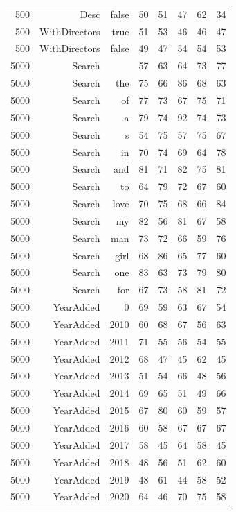 \begin{longtable}{rrrrrrrr}
	500 & Desc & false & 50 & 51 & 47 & 62 & 34 \\
	500 & WithDirectors & true & 51 & 53 & 46 & 46 & 47 \\
	500 & WithDirectors & false & 49 & 47 & 54 & 54 & 53 \\
	5000 & Search &  & 57 & 63 & 64 & 73 & 77 \\
	5000 & Search & the & 75 & 66 & 86 & 68 & 63 \\
	5000 & Search & of & 77 & 73 & 67 & 75 & 71 \\
	5000 & Search & a & 79 & 74 & 92 & 74 & 73 \\
	5000 & Search & s & 54 & 75 & 57 & 75 & 67 \\
	5000 & Search & in & 70 & 74 & 69 & 64 & 78 \\
	5000 & Search & and & 81 & 71 & 82 & 75 & 81 \\
	5000 & Search & to & 64 & 79 & 72 & 67 & 60 \\
	5000 & Search & love & 70 & 75 & 68 & 66 & 84 \\
	5000 & Search & my & 82 & 56 & 81 & 67 & 58 \\
	5000 & Search & man & 73 & 72 & 66 & 59 & 76 \\
	5000 & Search & girl & 68 & 86 & 65 & 77 & 60 \\
	5000 & Search & one & 83 & 63 & 73 & 79 & 80 \\
	5000 & Search & for & 67 & 73 & 58 & 81 & 72 \\
	5000 & YearAdded & 0 & 69 & 59 & 63 & 67 & 54 \\
	5000 & YearAdded & 2010 & 60 & 68 & 67 & 56 & 63 \\
	5000 & YearAdded & 2011 & 71 & 55 & 56 & 54 & 55 \\
	5000 & YearAdded & 2012 & 68 & 47 & 45 & 62 & 45 \\
	5000 & YearAdded & 2013 & 51 & 54 & 66 & 48 & 56 \\
	5000 & YearAdded & 2014 & 69 & 65 & 51 & 49 & 66 \\
	5000 & YearAdded & 2015 & 67 & 80 & 60 & 59 & 57 \\
	5000 & YearAdded & 2016 & 60 & 58 & 67 & 67 & 67 \\
	5000 & YearAdded & 2017 & 58 & 45 & 64 & 58 & 45 \\
	5000 & YearAdded & 2018 & 48 & 56 & 51 & 62 & 60 \\
	5000 & YearAdded & 2019 & 48 & 61 & 44 & 58 & 52 \\
	5000 & YearAdded & 2020 & 64 & 46 & 70 & 75 & 58 \\

\end{longtable}
